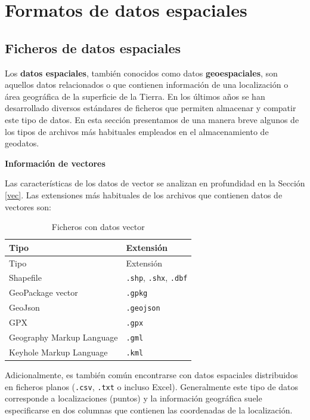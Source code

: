 \documentclass[
]{report}
\begin{document}
\hypertarget{formatos}{%
\chapter{Formatos de datos espaciales}\label{formatos}}

\hypertarget{ficheros-de-datos-espaciales}{%
\section{Ficheros de datos espaciales}\label{ficheros-de-datos-espaciales}}

Los \textbf{datos espaciales}, también conocidos como datos \textbf{geoespaciales}, son
aquellos datos relacionados o que contienen información de una localización o
área geográfica de la superficie de la Tierra. En los últimos años se han
desarrollado diversos estándares de ficheros que permiten almacenar y compatir
este tipo de datos. En esta sección presentamos de una manera breve algunos de
los tipos de archivos más habituales empleados en el almacenamiento de geodatos.

\textbf{Información de vectores}

Las características de los datos de vector se analizan en profundidad en la
Sección \ref{vec}. Las extensiones más habituales de los archivos que contienen
datos de vectores son:

\begin{longtable}[]{@{}ll@{}}
\caption{Ficheros con datos vector}\tabularnewline
\toprule
Tipo & Extensión \\
\midrule
\endfirsthead
\toprule
Tipo & Extensión \\
\midrule
\endhead
Shapefile & \texttt{.shp}, \texttt{.shx}, \texttt{.dbf} \\
GeoPackage vector & \texttt{.gpkg} \\
GeoJson & \texttt{.geojson} \\
GPX & \texttt{.gpx} \\
Geography Markup Language & \texttt{.gml} \\
Keyhole Markup Language & \texttt{.kml} \\
\bottomrule
\end{longtable}

Adicionalmente, es también común encontrarse con datos espaciales distribuidos
en ficheros planos (\texttt{.csv}, \texttt{.txt} o incluso Excel). Generalmente este tipo de
datos corresponde a localizaciones (puntos) y la información geográfica suele
especificarse en dos columnas que contienen las coordenadas de la localización.
\end{document}
